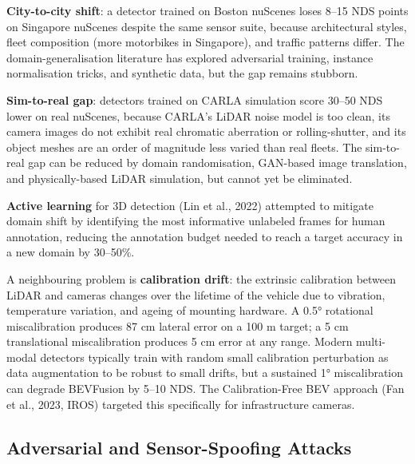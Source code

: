 \textbf{City-to-city shift}: a detector trained on Boston nuScenes loses 8--15 NDS points on Singapore nuScenes despite the same sensor suite, because architectural styles, fleet composition (more motorbikes in Singapore), and traffic patterns differ. The domain-generalisation literature has explored adversarial training, instance normalisation tricks, and synthetic data, but the gap remains stubborn.

\textbf{Sim-to-real gap}: detectors trained on CARLA simulation score 30--50 NDS lower on real nuScenes, because CARLA's LiDAR noise model is too clean, its camera images do not exhibit real chromatic aberration or rolling-shutter, and its object meshes are an order of magnitude less varied than real fleets. The sim-to-real gap can be reduced by domain randomisation, GAN-based image translation, and physically-based LiDAR simulation, but cannot yet be eliminated.

\textbf{Active learning} for 3D detection (Lin et al., 2022) attempted to mitigate domain shift by identifying the most informative unlabeled frames for human annotation, reducing the annotation budget needed to reach a target accuracy in a new domain by 30--50\%.

A neighbouring problem is \textbf{calibration drift}: the extrinsic calibration between LiDAR and cameras changes over the lifetime of the vehicle due to vibration, temperature variation, and ageing of mounting hardware. A 0.5° rotational miscalibration produces 87 cm lateral error on a 100 m target; a 5 cm translational miscalibration produces 5 cm error at any range. Modern multi-modal detectors typically train with random small calibration perturbation as data augmentation to be robust to small drifts, but a sustained 1° miscalibration can degrade BEVFusion by 5--10 NDS. The Calibration-Free BEV approach (Fan et al., 2023, IROS) targeted this specifically for infrastructure cameras.

\subsection{Adversarial and Sensor-Spoofing Attacks}\label{adversarial-and-sensor-spoofing-attacks}


